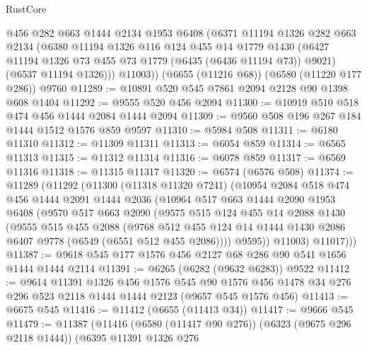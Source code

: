 \begin{lexlean}{RustCore}
\begin{coremodule}
{\begin{coremodule}
{{{{{{{{{{{{{{{{{{{{{{{{{{{{{{{{{{{{{{{{{{{{{        @456
        @282
        @663
        @1444
        @2134
        @1953
        @6408
        (@6371
          @11194
          @1326
          @282
          @663
          @2134
          (@6380
            @11194
            @1326
            @116
            @124
            @455
            @14
            @1779
            @1430
            (@6427 @11194 @1326 @73 @455 @73 @1779 (@6435 (@6436 @11194 @73)) @9021)
            (@6537 @11194 @1326)))
        @11003))
    (@6655 (@11216 @68))
    (@6580 (@11220 @177 @286))
    @9760
@11289 := @10891 @520 @545 @7861 @2094 @2128 @90 @1398 @608 @1404
@11292 := @9555 @520 @456 @2094
@11300 := @10919 @510 @518 @474 @456 @1444 @2084 @1444 @2094
@11309 := @9560 @508 @196 @267 @184 @1444 @1512 @1576 @859 @9597
@11310 := @5984 @508
@11311 := @6180 @11310
@11312 := @11309 @11311
@11313 := @6054 @859
@11314 := @6565 @11313
@11315 := @11312 @11314
@11316 := @6078 @859
@11317 := @6569 @11316
@11318 := @11315 @11317
@11320 := @6574 (@6576 @508)
@11374 := @11289
    (@11292
      (@11300
        (@11318 @11320 @7241)
        (@10954
          @2084
          @518
          @474
          @456
          @1444
          @2091
          @1444
          @2036
          (@10964
            @517
            @663
            @1444
            @2090
            @1953
            @6408
            (@9570
              @517
              @663
              @2090
              (@9575
                @515
                @124
                @455
                @14
                @2088
                @1430
                (@9555
                  @515
                  @455
                  @2088
                  (@9768
                    @512
                    @455
                    @124
                    @14
                    @1444
                    @1430
                    @2086
                    @6407
                    @9778
                    (@6549 (@6551 @512 @455 @2086))))
                @9595))
            @11003)
          @11017)))
@11387 := @9618 @545 @177 @1576 @456 @2127 @68 @286 @90 @541 @1656 @1444 @1444 @2114
@11391 := @6265 (@6282 (@9632 @6283)) @9522
@11412 := @9614
    @11391
    @1326
    @456
    @1576
    @545
    @90
    @1576
    @456
    @1478
    @34
    @276
    @296
    @523
    @2118
    @1444
    @1444
    @2123
    (@9657 @545 @1576 @456)
@11413 := @6675 @545
@11416 := @11412 (@6655 (@11413 @34))
@11417 := @9666 @545
@11479 := @11387
    (@11416
      (@6580 (@11417 @90 @276))
      (@6323 (@9675 @296 @2118 @1444))
      (@6395
        @11391
        @1326
        @276
}}}}}}}}}}}}}}}}}}}}}}}}}}}}}}}}}}}}}}}}}}}}}
\end{coremodule}}
\end{coremodule}
\end{lexlean}

